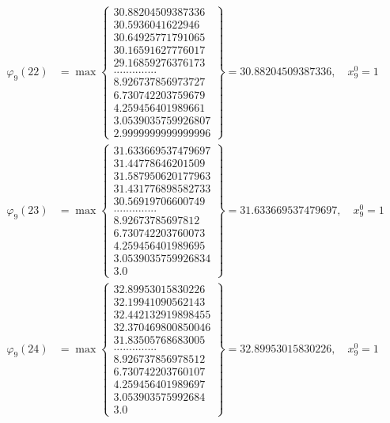 \documentclass{article}
\begin{document}
\begin{align*}
  
  
  
\varphi_{9}(22) &= \max \left\{ \begin{array}{c}
30.88204509387336 \\
 30.5936041622946 \\
 30.64925771791065 \\
 30.16591627776017 \\
 29.16859276376173 \\
 .............. \\
 8.926737856973727 \\
 6.730742203759679 \\
 4.259456401989661 \\
 3.0539035759926807 \\
 2.9999999999999996
\end{array} \right\} = 30.88204509387336, \quad x_{9}^0 = 1\\
  
  
  
  
\varphi_{9}(23) &= \max \left\{ \begin{array}{c}
31.633669537479697 \\
 31.44778646201509 \\
 31.587950620177963 \\
 31.431776898582733 \\
 30.56919706600749 \\
 .............. \\
 8.92673785697812 \\
 6.730742203760073 \\
 4.259456401989695 \\
 3.0539035759926834 \\
 3.0
\end{array} \right\} = 31.633669537479697, \quad x_{9}^0 = 1\\
  
  
  
  
\varphi_{9}(24) &= \max \left\{ \begin{array}{c}
32.89953015830226 \\
 32.19941090562143 \\
 32.442132919898455 \\
 32.370469800850046 \\
 31.83505768683005 \\
 .............. \\
 8.926737856978512 \\
 6.730742203760107 \\
 4.259456401989697 \\
 3.053903575992684 \\
 3.0
\end{array} \right\} = 32.89953015830226, \quad x_{9}^0 = 1\\
  

\end{align*}
\end{document}
